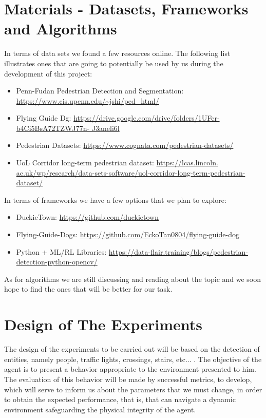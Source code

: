\documentclass[letterpaper,10pt]{article}
\begin{document}
\section{Materials - Datasets, Frameworks and Algorithms} 

In terms of data sets we found a few resources online. The following list
illustrates ones that are going to potentially be used by us during the 
development of this project:
\begin{itemize}
  \item Penn-Fudan Pedestrian Detection and Segmentation: 
    \url{https://www.cis.upenn.edu/~jshi/ped_html/}
  \item Flying Guide Dg: 
    \url{https://drive.google.com/drive/folders/1UFcr-b4Ci5BsA72TZWJ77n-
    J3aneli6l}
  \item Pedestrian Datasets: \url{https://www.cognata.com/pedestrian-datasets/}
  \item UoL Corridor long-term pedestrian dataset: \url{https://lcas.lincoln.
    ac.uk/wp/research/data-sets-software/uol-corridor-long-term-pedestrian-
    dataset/}
\end{itemize}
In terms of frameworks we have a few options that we plan to explore: 
\begin{itemize}
  \item DuckieTown: \url{https://github.com/duckietown} 
  \item Flying-Guide-Dogs: 
    \url{https://github.com/EckoTan0804/flying-guide-dog}
  \item Python + ML/RL Libraries: 
    \url{https://data-flair.training/blogs/pedestrian-detection-python-opencv/}
\end{itemize}
As for algorithms we are still discussing and reading about the topic and we
soon hope to find the ones that will be better for our task.

\section{Design of The Experiments}

The design of the experiments to be carried out will be based on the 
detection of entities, namely people, traffic lights, crossings, 
stairs, etc... . The objective of the agent is to present a behavior 
appropriate to the environment presented to him. The evaluation of this 
behavior will be made by successful metrics, to develop, which will serve 
to inform us about the parameters that we must change, in order to obtain 
the expected performance, that is, that can navigate a dynamic environment 
safeguarding the physical integrity of the agent.
\end{document}
